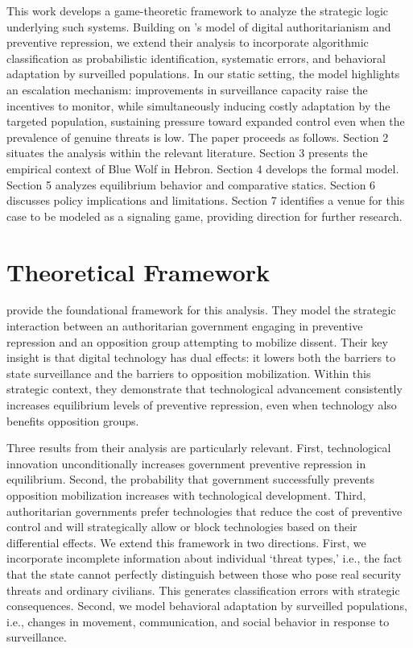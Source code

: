 \documentclass[11pt,a4paper]{article}
\theoremstyle{definition}
\theoremstyle{remark}
\theoremstyle{definition}
\begin{document}
This work develops a game-theoretic framework to analyze the strategic logic underlying such systems. Building on \citet{dragu2021digital}'s 
model of digital authoritarianism and preventive repression, we extend their analysis to incorporate algorithmic classification as probabilistic 
identification, systematic errors, and behavioral adaptation by surveilled populations. In our static setting, the model highlights an escalation 
mechanism: improvements in surveillance capacity raise the incentives to monitor, while simultaneously inducing costly adaptation by the targeted 
population, sustaining pressure toward expanded control even when the prevalence of genuine threats is low. The paper proceeds as follows. 
Section 2 situates the analysis within the relevant literature. 
Section 3 presents the empirical context of Blue Wolf in Hebron. Section 4 develops the formal model. Section 5 analyzes equilibrium behavior 
and comparative statics. Section 6 discusses policy implications and limitations. Section 7 identifies a venue for this case to be modeled as 
a signaling game, providing direction for further research. 

\section{Theoretical Framework}

\citet{dragu2021digital} provide the foundational framework for this analysis. They model the strategic interaction between an authoritarian 
government engaging in preventive repression and an opposition group attempting to mobilize dissent. Their key insight is that digital 
technology has dual effects: it lowers both the barriers to state surveillance and the barriers to opposition mobilization. Within this strategic 
context, they demonstrate that technological advancement consistently increases equilibrium levels of preventive repression, even when technology 
also benefits opposition groups. 

Three results from their analysis are particularly relevant. First, technological innovation unconditionally 
increases government preventive repression in equilibrium. Second, the probability that government successfully prevents opposition mobilization 
increases with technological development. Third, authoritarian governments prefer technologies that reduce the cost of preventive control and
will strategically allow or block technologies based on their differential effects. We extend this framework in two directions. First, we 
incorporate incomplete information about individual `threat types,' i.e., the fact that the state cannot perfectly distinguish between those who 
pose real security threats and ordinary civilians. This generates classification errors with strategic consequences. Second, we model behavioral 
adaptation by surveilled populations, i.e., changes in movement, communication, and social behavior in response to surveillance. 
\end{document}
